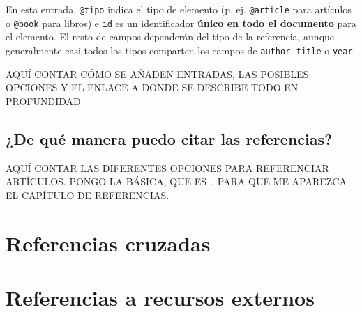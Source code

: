 En esta entrada, \texttt{@tipo} indica el tipo de elemento (p. ej. \texttt{@article} para artículos o \texttt{@book} para libros) e \texttt{id} es un identificador \textbf{único en todo el documento} para el elemento. El resto de campos dependerán del tipo de la referencia, aunque generalmente casi todos los tipos comparten los campos de \texttt{author}, \texttt{title} o \texttt{year}.

AQUÍ CONTAR CÓMO SE AÑADEN ENTRADAS, LAS POSIBLES OPCIONES Y EL ENLACE A DONDE SE DESCRIBE TODO EN PROFUNDIDAD

\subsection{¿De qué manera puedo citar las referencias?}

AQUÍ CONTAR LAS DIFERENTES OPCIONES PARA REFERENCIAR ARTÍCULOS. PONGO LA BÁSICA, QUE ES~\cite{mcculloch1943logical}, PARA QUE ME APAREZCA EL CAPÍTULO DE REFERENCIAS.

\section{Referencias cruzadas}

\section{Referencias a recursos externos}
